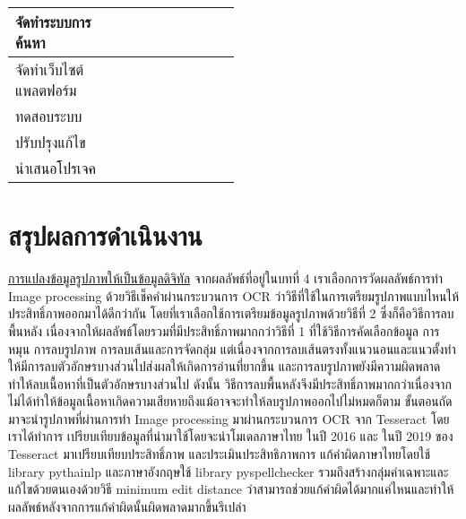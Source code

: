 \begin{table}[H]
\begin{tabular}{|p{0.5\linewidth}|l|l|l|}
จัดทำระบบการค้นหา                                                                    &                                      &           &  \cellcolor[HTML]{92D050}                               \\ \hline
จัดทำเว็บไซต์แพลตฟอร์ม                                                               &                                      &                                     & \cellcolor[HTML]{92D050}       \\ \hline
ทดสอบระบบ                                                                            &                                      &            &  \cellcolor[HTML]{92D050}                               \\ \hline
ปรับปรุงแก้ไข                                                                        &                                      & 	            &   \cellcolor[HTML]{92D050}                             \\ \hline
นำเสนอโปรเจค                                                                         &                 & \cellcolor[HTML]{FFC702}	               &                                 \\ \hline
\end{tabular}
\end{table}
\section{สรุปผลการดำเนินงาน}

\underline{การแปลงข้อมูลรูปภาพให้เป็นข้อมูลดิจิทัล}
จากผลลัพธ์ที่อยู่ในบทที่ 4 เราเลือกการวัดผลลัพธ์การทำ Image processing ด้วยวิธีเช็คคำผ่านกระบวนการ OCR ว่าวิธีที่ใช้ในการเตรียมรูปภาพแบบไหนให้ประสิทธิ์ภาพออกมาได้ดีกว่ากัน
โดยที่เราเลือกใช้การเตรียมข้อมูลรูปภาพด้วยวิธีที่ 2 ซึ่งก็คือวิธีการลบพื้นหลัง เนื่องจากให้ผลลัพธ์โดยรวมที่มีประสิทธิ์ภาพมากกว่าวิธีที่ 1 
ที่ใช้วิธีการคัดเลือกข้อมูล การหมุน การลบรูปภาพ การลบเส้นและการจัดกลุ่ม แต่เนื่องจากการลบเส้นตรงทั้งแนวนอนและแนวตั้งทำ
ให้มีการลบตัวอักษรบางส่วนไปส่งผลให้เกิดการอ่านที่ยากขึ้น 
และการลบรูปภาพยังมีความผิดพลาดทำให้ลบเนื้อหาที่เป็นตัวอักษรบางส่วนไป ดังนั้น
วิธีการลบพื้นหลังจึงมีประสิทธิ์ภาพมากกว่าเนื่องจากไม่ได้ทำให้ข้อมูลเนื้อหาเกิดความเสียหายถึงแม้อาจจะทำให้ลบรูปภาพออกไปไม่หมดก็ตาม 
ขั้นตอนถัดมาจะนำรูปภาพที่ผ่านการทำ Image processing มาผ่านกระบวนการ OCR จาก Tesseract โดยเราได้ทำการ
เปรียบเทียบข้อมูลที่นำมาใช้โดยจะนำโมเดลภาษาไทย ในปี 2016 และ ในปี 2019 ของ Tesseract มาเปรียบเทียบประสิทธิ์ภาพ และประเมินประสิทธิภาพการ
แก้คำผิดภาษาไทยโดยใช้ library pythainlp และภาษาอังกฤษใช้ library pyspellchecker รวมถึงสร้างกลุ่มคำเฉพาะและ
แก้ไขด้วยตนเองด้วยวิธี minimum edit distance ว่าสามารถช่วยแก้คำผิดได้มากแค่ไหนและทำให้ผลลัพธ์หลังจากการแก้คำผิดนั้นผิดพลาดมากขึ้นรึเปล่า

